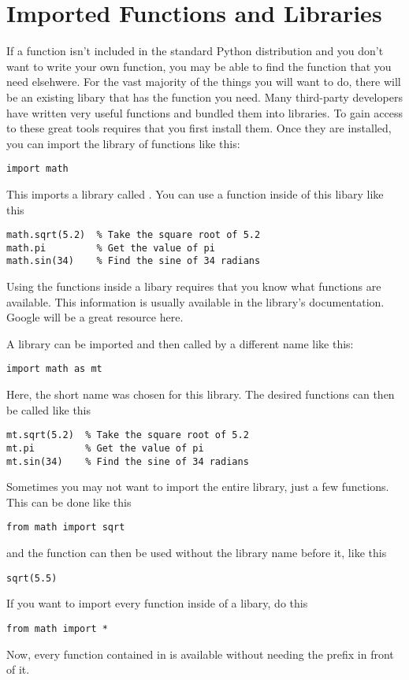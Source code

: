 \section{Imported Functions and Libraries}
If a function isn't included in the standard Python distribution and
you don't want to write your own function, you may be able to find the
function that you need elsehwere.  For the vast majority of the things
you will want to do, there will be an existing libary that has the
function you need. Many third-party developers have
written very useful functions and bundled them into libraries.  To
gain access to these great tools requires that you first install
them. Once they are
installed, you can import the library of functions like this:
\begin{Verbatim}
import math
\end{Verbatim}
This imports a library called .  You can use a function
inside of this libary like this
\begin{Verbatim}
math.sqrt(5.2)  % Take the square root of 5.2
math.pi         % Get the value of pi
math.sin(34)    % Find the sine of 34 radians
\end{Verbatim}
Using the functions inside a libary requires that you know what
functions are available.  This information is usually available in the
library's documentation.  Google will be a great resource here.

A library can be imported and then called by a different name like
this:
\begin{Verbatim}
import math as mt
\end{Verbatim}
Here, the short name  was chosen for this library.
The desired functions can then be called like this
\begin{Verbatim}
mt.sqrt(5.2)  % Take the square root of 5.2
mt.pi         % Get the value of pi
mt.sin(34)    % Find the sine of 34 radians
\end{Verbatim}

Sometimes you may not want to import the entire library, just a few
functions. This can be done like this
\begin{Verbatim}
from math import sqrt
\end{Verbatim}
and the  function can then be used without the library
name before it, like this
\begin{Verbatim}
sqrt(5.5)
\end{Verbatim}
If you want to import every function inside of a libary, do this
\begin{Verbatim}
from math import *
\end{Verbatim}
Now, every function contained in  is available without
needing the  prefix in front of it.

